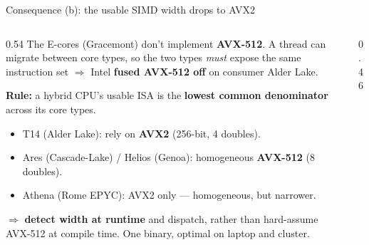 \documentclass[aspectratio=169,10pt]{beamer}
\begin{document}
\begin{frame}{Consequence (b): the usable SIMD width drops to AVX2}
  \begin{columns}[T]
    \begin{column}{0.54\textwidth}
      \small
      The E-cores (Gracemont) don't implement \textbf{AVX-512}. A thread can
      migrate between core types, so the two types \emph{must} expose the same
      instruction set $\Rightarrow$ Intel \textbf{fused AVX-512 off} on consumer
      Alder Lake.
      \medskip

      \textbf{Rule:} a hybrid CPU's usable ISA is the \textbf{lowest common
      denominator} across its core types.
      \begin{itemize}\scriptsize\itemsep2pt
        \item T14 (Alder Lake): rely on \textbf{AVX2} (256-bit, 4 doubles).
        \item Ares (Cascade-Lake) / Helios (Genoa): homogeneous
              \textbf{AVX-512} (8 doubles).
        \item Athena (Rome EPYC): AVX2 only — homogeneous, but narrower.
      \end{itemize}
      $\Rightarrow$ \textbf{detect width at runtime} and dispatch, rather than
      hard-assume AVX-512 at compile time. One binary, optimal on laptop and
      cluster.
    \end{column}
    \begin{column}{0.46\textwidth}
      \centering
    \end{column}
  \end{columns}
\end{frame}
\end{document}
